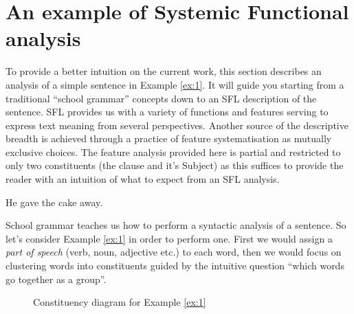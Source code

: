 \section{An example of Systemic Functional analysis}
\label{sec:example}
To provide a better intuition on the current work, this section describes an analysis of a simple sentence in Example \ref{ex:1}. It will guide you starting from a traditional ``school grammar'' concepts down to an SFL description of the sentence. %
SFL provides us with a variety of functions and features serving to express text meaning from several perspectives. Another source of the descriptive breadth is achieved through a practice of feature systematisation as mutually exclusive choices. %
The feature analysis provided here is partial and restricted to only two constituents (the clause and it's Subject) as this suffices to provide the reader with an intuition of what to expect from an SFL analysis.

\begin{exe}
    \ex\label{ex:1} He gave the cake away.
\end{exe}

School grammar teaches us how to perform a syntactic analysis of a sentence. So let's consider Example \ref{ex:1} in order to perform one. First we would assign a \textit{part of speech} (verb, noun, adjective etc.) to each word, then we would focus on clustering words into constituents guided by the intuitive question ``which words go together as a group''.

\begin{figure}[!ht]
    \centering
    \caption{Constituency diagram for Example \ref{ex:1}}
    \label{fig:mcg-graph-example-simple-structure}
\end{figure}

